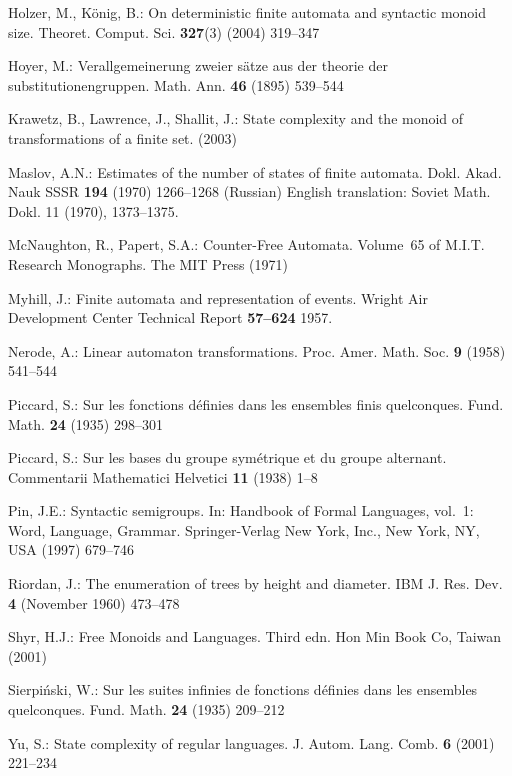\documentclass{llncs}
\begin{document}
\begin{thebibliography}{10}
Holzer, M., K\"{o}nig, B.:
\newblock On deterministic finite automata and syntactic monoid size.
\newblock Theoret. Comput. Sci. \textbf{327}(3) (2004)  319--347

Hoyer, M.:
\newblock Verallgemeinerung zweier s\"atze aus der theorie der
  substitutionengruppen.
\newblock Math. Ann. \textbf{46} (1895)  539--544

Krawetz, B., Lawrence, J., Shallit, J.:
\newblock State complexity and the monoid of transformations of a finite set.
 (2003)

Maslov, A.N.:
\newblock Estimates of the number of states of finite automata.
\newblock Dokl. Akad. Nauk SSSR \textbf{194} (1970)  1266--1268 (Russian)
  {English} translation: Soviet Math. Dokl. 11 (1970), 1373--1375.

McNaughton, R., Papert, S.A.:
\newblock Counter-Free Automata. Volume~65 of M.I.T. Research Monographs.
\newblock The MIT Press (1971)

Myhill, J.:
\newblock Finite automata and representation of events.
\newblock Wright Air Development Center Technical Report \textbf{57--624} 1957.

Nerode, A.:
\newblock Linear automaton transformations.
\newblock Proc. Amer. Math. Soc. \textbf{9} (1958)  541--544

Piccard, S.:
\newblock Sur les fonctions d\'efinies dans les ensembles finis quelconques.
\newblock Fund. Math. \textbf{24} (1935)  298--301

Piccard, S.:
\newblock Sur les bases du groupe sym\'etrique et du groupe alternant.
\newblock Commentarii Mathematici Helvetici \textbf{11} (1938)  1--8

Pin, J.E.:
\newblock Syntactic semigroups.
\newblock In: Handbook of Formal Languages, vol.~1: Word, Language, Grammar.
\newblock Springer-Verlag New York, Inc., New York, NY, USA (1997)  679--746

Riordan, J.:
\newblock The enumeration of trees by height and diameter.
\newblock IBM J. Res. Dev. \textbf{4} (November 1960)  473--478

Shyr, H.J.:
\newblock Free Monoids and Languages. Third edn.
\newblock Hon Min Book Co, Taiwan (2001)

Sierpi\'nski, W.:
\newblock Sur les suites infinies de fonctions d\'efinies dans les ensembles
  quelconques.
\newblock Fund. Math. \textbf{24} (1935)  209--212

Yu, S.:
\newblock State complexity of regular languages.
\newblock J. Autom. Lang. Comb. \textbf{6} (2001)  221--234

\end{thebibliography}
\end{document}
